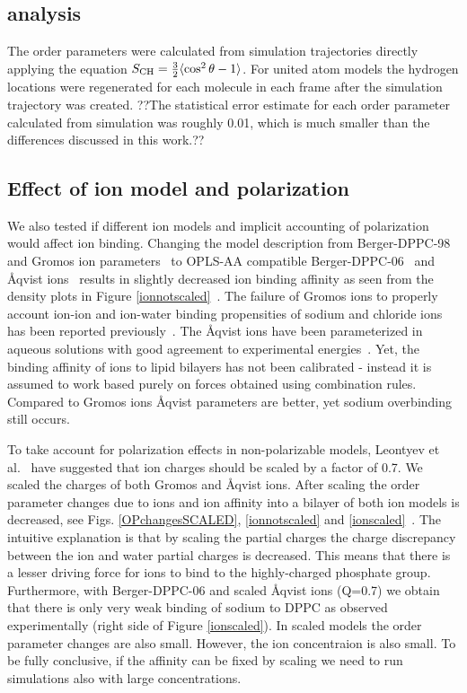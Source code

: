 \documentclass[pre,aps,floatfix,authordate1-4,twocolumn]{revtex4-1}
\begin{document}
\subsection{analysis}
The order parameters were calculated from simulation trajectories directly applying the equation
$S_{{\rm CH}}=\frac{3}{2} \langle \cos^2 \theta-1 \rangle$. For united atom models the hydrogen locations
were regenerated for each molecule in each frame after the simulation trajectory was created.
??The statistical error estimate for each order parameter calculated from simulation was roughly
0.01, which is much smaller than the differences discussed in this work.??


\subsection{Effect of ion model and polarization}

 We also tested if different ion models and implicit accounting of polarization would affect ion binding.
 Changing the model description from Berger-DPPC-98~\cite{Marrink98} and Gromos ion
 parameters~\cite{??} to OPLS-AA compatible
 Berger-DPPC-06~\cite{tieleman06} and \r{A}qvist ions~\cite{Aaqvist90} results in slightly decreased ion binding affinity
 as seen from the density plots in Figure \ref{ionnotscaled}~\cite{DPPCBergerNaCl, DPPCBergerOPLS06NaCl}. The failure
 of Gromos ions to properly account ion-ion and ion-water binding propensities of sodium and chloride ions has been
 reported previously~\cite{Reif13}. The \r{A}qvist ions have been parameterized in aqueous solutions with good agreement
 to experimental energies~\cite{Aaqvist90}. Yet, the binding affinity of ions to lipid bilayers has not been
 calibrated - instead it is assumed to work based purely on forces obtained using combination rules. Compared to Gromos
 ions \r{A}qvist parameters are better, yet sodium overbinding still occurs.

To take account for polarization effects in non-polarizable models, Leontyev et al.~\cite{leontyev11} have suggested
that ion charges should be scaled by a factor of 0.7. We scaled the charges of both Gromos and \r{A}qvist ions. 
After scaling the order parameter changes due to ions and ion affinity into a bilayer of both ion models is decreased, see
Figs. \ref{OPchangesSCALED}, \ref{ionnotscaled} and \ref{ionscaled}~\cite{DPPCBergerNaClscaled, DPPCBergerOPLS06NaClscaled}. The intuitive explanation is that by
scaling the partial charges the charge discrepancy between the ion and water partial charges is decreased. This means
that there is a lesser driving force for ions to bind to the highly-charged phosphate group. Furthermore, with
Berger-DPPC-06 and scaled Åqvist ions (Q=0.7) we obtain that there is only very weak binding of sodium to DPPC as
observed experimentally (right side of Figure \ref{ionscaled}). In scaled models the order parameter changes 
are also small. However, the ion concentraion is also small. To be fully conclusive, if the affinity can be fixed by scaling
we need to run simulations also with large concentrations.
\end{document}
